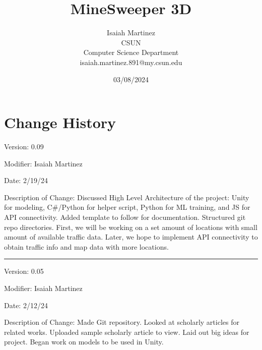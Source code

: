 \documentclass[a4paper,10pt]{article}
\begin{document}
    \title{MineSweeper 3D}

    \author{Isaiah Martinez \\ CSUN \\ Computer Science Department \\ isaiah.martinez.891@my.csun.edu}
          
    \date{03/08/2024}

    \maketitle
   
    \tableofcontents

    \newpage

    \section{Change History}

    Version: 0.09

    Modifier: Isaiah Martinez
    
    Date: 2/19/24
    
    Description of Change: Discussed High Level Architecture of the project: Unity for modeling, C\#/Python for helper script, Python for ML training, and JS for API connectivity.
    Added template to follow for documentation.
    Structured git repo directories.
    First, we will be working on a set amount of locations with small amount of available traffic data.
    Later, we hope to implement API connectivity to obtain traffic info and map data with more locations.
 
    \noindent\rule{12cm}{0.4pt}

    Version: 0.05

    Modifier: Isaiah Martinez
    
    Date: 2/12/24
    
    Description of Change: Made Git repository. 
    Looked at scholarly articles for related works.
    Uploaded sample scholarly article to view.
    Laid out big ideas for project.
    Began work on models to be used in Unity.
 
    
    \newpage
    
    
    
    
    
    
    
    
    
\end{document}
